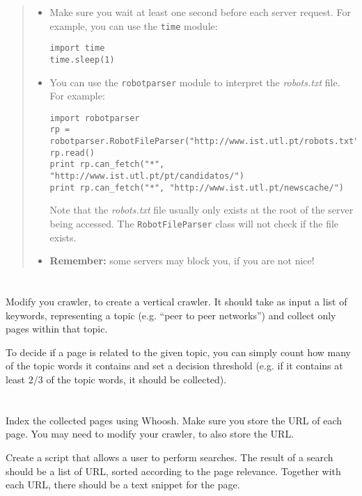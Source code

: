 \documentclass[12pt]{article}
\begin{document}
\begin{quote}
\begin{itemize}
    \item Make sure you wait at least one second before each server
        request. For example, you can use the \texttt{time} module:
\begin{verbatim}
import time
time.sleep(1)
\end{verbatim}
    \item You can use the \texttt{robotparser} module to interpret the
        \emph{robots.txt} file. For example:
\begin{verbatim}
import robotparser
rp = robotparser.RobotFileParser("http://www.ist.utl.pt/robots.txt")
rp.read()
print rp.can_fetch("*", "http://www.ist.utl.pt/pt/candidatos/")
print rp.can_fetch("*", "http://www.ist.utl.pt/newscache/")
\end{verbatim}
        Note that the \emph{robots.txt} file usually only exists at the root of
        the server being accessed. The \texttt{RobotFileParser} class will not
        check if the file exists.
    \item \textbf{Remember:} some servers may block you, if you are not nice!
    \end{itemize}
\end{quote}


\section{}

Modify you crawler, to create a vertical crawler. It should take as input a
list of keywords, representing a topic (e.g. ``peer to peer networks'') and
collect only pages within that topic.

To decide if a page is related to the given topic, you can simply count how
many of the topic words it contains and set a decision threshold (e.g. if it
contains at least $2/3$ of the topic words, it should be collected).

\section{}

Index the collected pages using Whoosh. Make sure you store the URL of each
page. You may need to modify your crawler, to also store the URL. 

Create a script that allows a user to perform searches. The result of a search
should be a list of URL, sorted according to the page relevance. Together with
each URL, there should be a text snippet for the page. 
\end{document}
